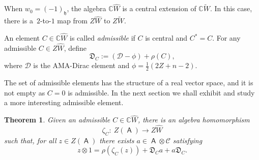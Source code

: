 \documentclass[pdftex]{sigma}
\numberwithin{equation}{section}
\newtheorem{Theorem}{Theorem}[section]
\newcommand{\fh}{\mathfrak{h}}
\newcommand{\bbc}{\mathbb{C}}
\DeclareMathOperator{\ama}{\mathsf{A}}
\begin{document}
When $w_0 = (-1)_\fh$, the algebra $\bbc \hat{W}$ is a central extension of $\bbc \tilde{W}$. In this case, there is a~$2$-to-$1$ map from $Z\hat{W}$ to $Z\tilde{W}$.

\begin{Definition}\label{d:Dirac_C}
An element $C\in \bbc\hat W$ is called {\it admissible} if $C$ is central and $C^* = C$. For any admissible $C\in Z\hat{W}$, define
\begin{equation}\label{e:CDirac}
\mathfrak{D}_C := (\mathcal{D} - \phi) + \rho(C),
\end{equation}
where $\mathcal{D}$ is the AMA-Dirac element and $\phi = \tfrac{1}{2}(2Z + n -2)$.
\end{Definition}

\begin{Remark}
The set of admissible elements has the structure of a real vector space,
and it is not empty as $C=0$ is admissible.
In the next section we shall exhibit and study a more interesting admissible element.
\end{Remark}

\begin{Theorem}\label{t:Vogan}
Given an admissible $C \in \bbc\hat W$, there is an algebra homomorphism
\[
\zeta_C\colon \ Z(\ama) \to Z\hat W
\]
such that, for all $z \in Z(\ama)$ there exists $a\in \ama\otimes \mathcal{C}$ satisfying
\[
z\otimes 1 = \rho(\zeta_C(z)) + \mathfrak{D}_Ca + a\mathfrak{D}_C.
\]
\end{Theorem}
\end{document}
